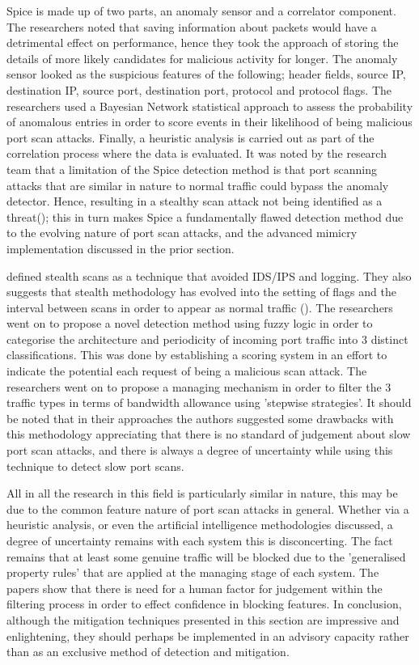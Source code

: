 Spice is made up of two parts, an anomaly sensor and a correlator component. The researchers noted that saving information about packets would have a detrimental effect on performance, hence they took the approach of storing the details of more likely candidates for malicious activity for longer. The anomaly sensor looked as the suspicious features of the following; header fields, source IP, destination IP, source port, destination port, protocol and protocol flags. The researchers used a Bayesian Network statistical approach to assess the probability of anomalous entries in order to score events in their likelihood of being malicious port scan attacks. Finally, a heuristic analysis is carried out as part of the correlation process where the data is evaluated. It was noted by the research team that a limitation of the Spice detection method is that port scanning attacks that are similar in nature to normal traffic could bypass the anomaly detector. Hence, resulting in a stealthy scan attack not being identified as a threat(\cite{staniford2002practical}); this in turn makes Spice a fundamentally flawed detection method due to the evolving nature of port scan attacks, and the advanced mimicry implementation discussed in the prior section.

\citeauthor{kim2008slow} defined stealth scans as a technique that avoided IDS/IPS and logging. They also suggests that stealth methodology has evolved into the setting of flags and the interval between scans in order to appear as normal traffic (\cite{kim2008slow}). The researchers went on to propose a novel detection method using fuzzy logic in order to categorise the architecture and periodicity of incoming port traffic into 3 distinct classifications. This was done by establishing a scoring system in an effort to indicate the potential each request of being a malicious scan attack. The researchers went on to propose a managing mechanism in order to filter the 3 traffic types in terms of bandwidth allowance using 'stepwise strategies'. It should be noted that in their approaches the authors suggested some drawbacks with this methodology appreciating that there is no standard of judgement about slow port scan attacks, and there is always a degree of uncertainty while using this technique to detect slow port scans.

All in all the research in this field is particularly similar in nature, this may be due to the common feature nature of port scan attacks in general. Whether via a heuristic analysis, or even the artificial intelligence methodologies discussed, a degree of uncertainty remains with each system this is disconcerting. The fact remains that at least some genuine traffic will be blocked due to the 'generalised property rules' that are applied at the managing stage of each system. The papers show that there is need for a human factor for judgement within the filtering process in order to effect confidence in blocking features. In conclusion, although the mitigation techniques presented in this section are impressive and enlightening, they should perhaps be implemented in an advisory capacity rather than as an exclusive method of detection and mitigation.
